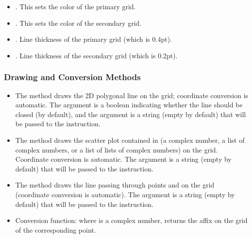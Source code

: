 \begin{itemize}
\begin{itemize}
    \item {}. This sets the color of the primary grid.
    
    \item {}. This sets the color of the secondary grid.
    
    \item {}. Line thickness of the primary grid (which is 0.4pt).
    
    \item {}. Line thickness of the secondary grid (which is 0.2pt).
    \end{itemize}
\end{itemize}

\subsubsection{Drawing and Conversion Methods}

\begin{itemize}
    \item The  method draws the 2D polygonal line  on the grid; coordinate conversion is automatic. The  argument is a boolean indicating whether the line should be closed (\false by default), and the  argument is a string (empty by default) that will be passed to the \drawcmd instruction.

    \item The method  draws the scatter plot contained in  (a complex number, a list of complex numbers, or a list of lists of complex numbers) on the grid. Coordinate conversion is automatic. The argument  is a string (empty by default) that will be passed to the \drawcmd instruction.

    \item The method  draws the line passing through points  and  on the grid (coordinate conversion is automatic). The argument  is a string (empty by default) that will be passed to the \drawcmd instruction.

    \item Conversion function:  where  is a complex number, returns the affix on the grid of the corresponding point.    
\end{itemize}

